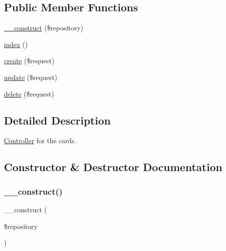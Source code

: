 \subsection*{Public Member Functions}
\begin{DoxyCompactItemize}
\item 
\mbox{\hyperlink{class_app_1_1_http_1_1_controllers_1_1_card_controller_a5b75ba6bc9debb999c0186a31978ec03}{\+\_\+\+\_\+construct}} (\$repository)
\item 
\mbox{\hyperlink{class_app_1_1_http_1_1_controllers_1_1_card_controller_a149eb92716c1084a935e04a8d95f7347}{index}} ()
\item 
\mbox{\hyperlink{class_app_1_1_http_1_1_controllers_1_1_card_controller_a4fa811c83f27da01b0d92bdb2a711a13}{create}} (\$request)
\item 
\mbox{\hyperlink{class_app_1_1_http_1_1_controllers_1_1_card_controller_ab7b27a90191560dcef32126b0945db0d}{update}} (\$request)
\item 
\mbox{\hyperlink{class_app_1_1_http_1_1_controllers_1_1_card_controller_a126a3799c44d72393ca4732081306dfd}{delete}} (\$request)
\end{DoxyCompactItemize}


\subsection{Detailed Description}
\mbox{\hyperlink{class_app_1_1_http_1_1_controllers_1_1_controller}{Controller}} for the cards. 

\subsection{Constructor \& Destructor Documentation}
\mbox{\label{class_app_1_1_http_1_1_controllers_1_1_card_controller_a5b75ba6bc9debb999c0186a31978ec03}} 
\subsubsection{\texorpdfstring{\+\_\+\+\_\+construct()}{\_\_construct()}}
{\footnotesize\ttfamily \+\_\+\+\_\+construct (\begin{DoxyParamCaption}\item[{}]{\$repository }\end{DoxyParamCaption})}


